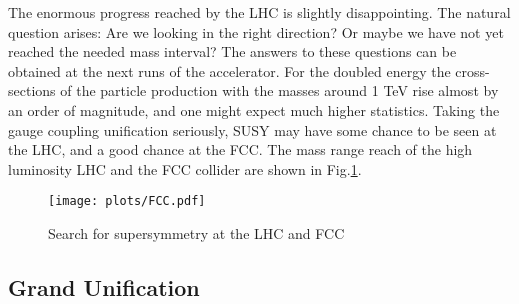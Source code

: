 \documentclass{cernyrep}
\begin{document}
\iffalse
There are many dedicated searches for strong and weak interacting particles.
\begin{figure}[htb]
\begin{center}
\leavevmode
\texttt{[image: plots/gluino.png]}
\texttt{[image: plots/gluino2.png]}
\texttt{[image: plots/stop.png]}
\end{center}
\caption{Search for supersymmetry: the universal parameter plot (upper raw) and the superpartner mass plot (lower raw)}
\label{gluino}
\end{figure}
\begin{figure}[htb]
\begin{center}
\leavevmode
\texttt{[image: plots/chargino.png]}
\end{center}
\caption{Search for supersymmetry: the universal parameter plot (upper raw) and the superpartner mass plot (lower raw)}
\label{chargino}
\end{figure}
\fi
The enormous progress reached by the LHC is slightly disappointing.  The natural question arises: Are we looking in the right direction? Or maybe we have not yet reached the needed mass interval? The answers to these questions can be obtained at the next runs of the accelerator. For the doubled energy the cross-sections of the particle production  with the masses around 1 TeV rise almost by an order of magnitude, and one might expect much higher statistics. Taking the gauge coupling unification seriously, SUSY may have some chance to be seen at the LHC, and a good chance at the
FCC. The mass range reach of the high luminosity LHC and the FCC collider are shown in Fig.\ref{future}.
 \begin{figure}[htb]
\begin{center}
\texttt{[image: plots/FCC.pdf]}
\end{center}
\caption{Search for supersymmetry at the LHC and FCC~\cite{FCC}}
\label{future}
\end{figure}

\subsection{Grand Unification}
\end{document}
